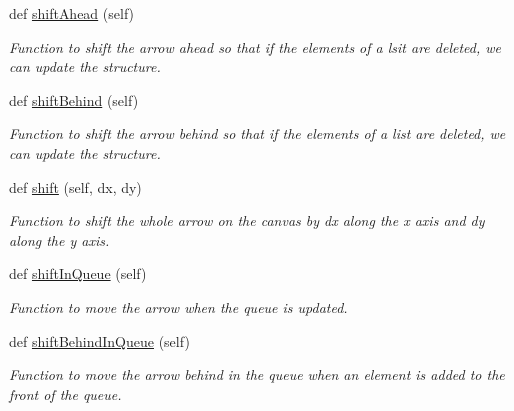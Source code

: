 \begin{DoxyCompactItemize}
\mbox{\label{classheaders_for_data_structures_1_1right_arrow_a3a9f5debd35ed66cc2b3a7c64397d530}} 
def \hyperlink{classheaders_for_data_structures_1_1right_arrow_a3a9f5debd35ed66cc2b3a7c64397d530}{shift\+Ahead} (self)
\begin{DoxyCompactList}\small\item\em Function to shift the arrow ahead so that if the elements of a lsit are deleted, we can update the structure. \end{DoxyCompactList}\item 
\mbox{\label{classheaders_for_data_structures_1_1right_arrow_a3e9d01ac5c06f2c21facde8562303d8f}} 
def \hyperlink{classheaders_for_data_structures_1_1right_arrow_a3e9d01ac5c06f2c21facde8562303d8f}{shift\+Behind} (self)
\begin{DoxyCompactList}\small\item\em Function to shift the arrow behind so that if the elements of a list are deleted, we can update the structure. \end{DoxyCompactList}\item 
def \hyperlink{classheaders_for_data_structures_1_1right_arrow_af8bc218c398594f3c400f9b7e0a30b8a}{shift} (self, dx, dy)
\begin{DoxyCompactList}\small\item\em Function to shift the whole arrow on the canvas by dx along the x axis and dy along the y axis. \end{DoxyCompactList}\item 
\mbox{\label{classheaders_for_data_structures_1_1right_arrow_a70f3a761d27bd00ff60b71bd4457752d}} 
def \hyperlink{classheaders_for_data_structures_1_1right_arrow_a70f3a761d27bd00ff60b71bd4457752d}{shift\+In\+Queue} (self)
\begin{DoxyCompactList}\small\item\em Function to move the arrow when the queue is updated. \end{DoxyCompactList}\item 
\mbox{\label{classheaders_for_data_structures_1_1right_arrow_a89971076429e090ee142a0ac82dd51ce}} 
def \hyperlink{classheaders_for_data_structures_1_1right_arrow_a89971076429e090ee142a0ac82dd51ce}{shift\+Behind\+In\+Queue} (self)
\begin{DoxyCompactList}\small\item\em Function to move the arrow behind in the queue when an element is added to the front of the queue. \end{DoxyCompactList}\end{DoxyCompactItemize}
